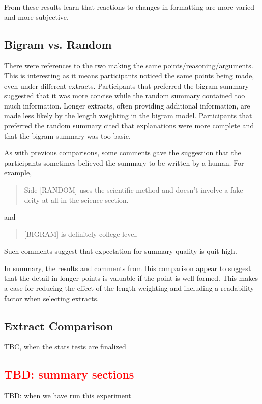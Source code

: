       From these results learn that reactions to changes in formatting are more varied and more subjective.

    \subsection{Bigram vs. Random}
      There were references to the two making the same points/reasoning/arguments. This is interesting as it means participants noticed the same points being made, even under different extracts. Participants that preferred the bigram summary suggested that it was more concise while the random summary contained too much information. Longer extracts, often providing additional information, are made less likely by the length weighting in the bigram model. Participants that preferred the random summary cited that explanations were more complete and that the bigram summary was too basic.

      As with previous comparisons, some comments gave the suggestion that the participants sometimes believed the summary to be written by a human. For example, \blockquote{Side [RANDOM] uses the scientific method and doesn't involve a fake deity at all in the science section.} and \blockquote{[BIGRAM] is definitely college level.}. Such comments suggest that expectation for summary quality is quit high.

      In summary, the results and comments from this comparison appear to suggest that the detail in longer points is valuable if the point is well formed. This makes a case for reducing the effect of the length weighting and including a readability factor when selecting extracts.

    \subsection{Extract Comparison}
      TBC, when the stats tests are finalized
    \subsection{\textcolor{red}{TBD: summary sections}}
      TBD: when we have run this experiment

